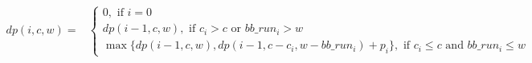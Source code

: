 \begin{strip}
        \begin{align}
                dp(i, c, w) = &
                \left\{
                        \begin{array}{l}
                                0, \text{ if $i=0$ } \\ [0.6em]
                                dp(i-1, c, w), \text{ if $c_i > c$ or $bb\_run_i > w$} \\ [0.6em]
                                \max \{ dp(i-1, c, w), dp(i-1, c - c_i, w - bb\_run_i) + p_i \}, \text{ if $c_i \leq c$ and $bb\_run_i \leq w$}
                        \end{array} 
                \right.
                \label{Equ:MaxProductRecursion}
        \end{align}
\end{strip}







